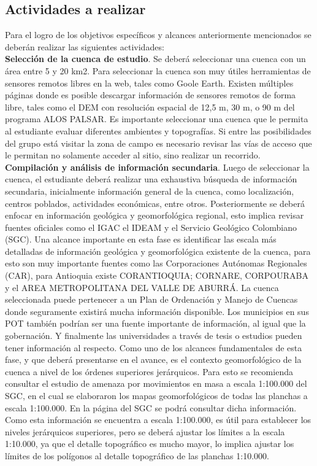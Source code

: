\documentclass[twoside,11pt,]{article}
\begin{document}
\subsection{Actividades a realizar}
Para el logro de los objetivos específicos y alcances anteriormente mencionados se deberán realizar las siguientes actividades:\\
\textbf{Selección de la cuenca de estudio}. Se deberá seleccionar una cuenca con un área entre 5 y 20 km2. Para seleccionar la cuenca son muy útiles herramientas de sensores remotos libres en la web, tales como Goole Earth. Existen múltiples páginas donde es posible descargar información de sensores remotos de forma libre, tales como el DEM con resolución espacial de 12,5 m, 30 m, o 90 m del programa ALOS PALSAR. Es importante seleccionar una cuenca que le permita al estudiante evaluar diferentes ambientes y topografías. Si entre las posibilidades del grupo está visitar la zona de campo es necesario revisar las vías de acceso que le permitan no solamente acceder al sitio, sino realizar un recorrido.
\\
\textbf{Compilación y análisis de información secundaria}. Luego de seleccionar la cuenca, el estudiante deberá realizar una exhaustiva búsqueda de información secundaria, inicialmente información general de la cuenca, como localización, centros poblados, actividades económicas, entre otros. Posteriormente se deberá enfocar en información geológica y geomorfológica regional, esto implica revisar fuentes oficiales como el IGAC el IDEAM y el Servicio Geológico Colombiano (SGC). Una alcance importante en esta fase es identificar las escala más detalladas de información geológica y geomorfológica existente de la cuenca, para esto son muy importante fuentes como las Corporaciones Autónomas Regionales (CAR), para Antioquia existe CORANTIOQUIA; CORNARE, CORPOURABA y el AREA METROPOLITANA DEL VALLE DE ABURRÁ. La cuenca seleccionada puede pertenecer a un Plan de Ordenación y Manejo de Cuencas donde seguramente existirá mucha información disponible. Los municipios en sus POT también podrían ser una fuente importante de información, al igual que la gobernación. Y finalmente las universidades a través de tesis o estudios pueden tener información al respecto. Como uno de los alcances fundamentales de esta fase, y que deberá presentarse en el avance, es el contexto geomorfológico de la cuenca a nivel de los órdenes superiores jerárquicos. Para esto se recomienda consultar el estudio de amenaza por movimientos en masa a escala 1:100.000 del SGC, en el cual se elaboraron los mapas geomorfológicos de todas las planchas a escala 1:100.000. En la página del SGC se podrá consultar dicha información. Como esta información se encuentra a escala 1:100.000, es útil para establecer los niveles jerárquicos superiores, pero se deberá ajustar los límites a la escala 1:10.000, ya que el detalle topográfico es mucho mayor, lo implica ajustar los límites de los polígonos al detalle topográfico de las planchas 1:10.000.
\end{document}
